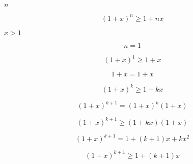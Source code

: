 \documentclass[10pt]{book}
\begin{document}
\begin{mdSnippets}
\begin{mdInlineSnippet}[7b8b965ad4bca0e41ab51de7b31363a1]%
$n$\end{mdInlineSnippet}%
\begin{mdDisplaySnippet}[f368a1526c7f504364b50aa4c541eb9f]%
\[%
(1 + x)^n \ge 1 + nx
\]%
\end{mdDisplaySnippet}%
\begin{mdInlineSnippet}[d0dfb6e138e2e13e9900819523d651fa]%
$x > 1$\end{mdInlineSnippet}%
\begin{mdDisplaySnippet}[ab78ccfbcd04b1ba22eb9427251cb20d]%
\[%
n = 1
\]%
\end{mdDisplaySnippet}%
\begin{mdDisplaySnippet}[d213d87543a5707039922f2022fb5e15]%
\[%
(1 + x)^1 \ge 1 + x
\]%
\end{mdDisplaySnippet}%
\begin{mdDisplaySnippet}[af12e9fe4c2d30b82ef9b33322d8890b]%
\[%
1 + x = 1 + x
\]%
\end{mdDisplaySnippet}%
\begin{mdDisplaySnippet}[599e8f94b0ed45cf9f5236d9879d57f4]%
\[%
(1 + x)^k \ge 1 + kx
\]%
\end{mdDisplaySnippet}%
\begin{mdDisplaySnippet}[31c9c43e2e03727806dd7f5014010353]%
\[%
(1 + x)^{k+1} = (1 + x)^k(1+x)  
\]%
\end{mdDisplaySnippet}%
\begin{mdDisplaySnippet}[d2f4a74515f36ec26b48f5077bafc2dd]%
\[%
(1 + x)^{k+1} \ge (1 + kx)(1 + x)
\]%
\end{mdDisplaySnippet}%
\begin{mdDisplaySnippet}[aa6cc59cde177e5a753a6c7a2e3a928f]%
\[%
(1 + x)^{k+1} = 1 + (k + 1)x + kx^2
\]%
\end{mdDisplaySnippet}%
\begin{mdDisplaySnippet}[7ce6aba1b945c6f9d05eb0d715b8f93d]%
\[%
(1 + x)^{k+1} \ge 1 + (k + 1)x
\]%
\end{mdDisplaySnippet}%
\begin{mdDisplaySnippet}[31e8e23334284b964dcac3c3373c273f]%

\end{mdDisplaySnippet}
\end{mdSnippets}
\end{document}
